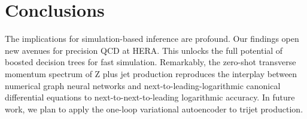\section{Conclusions}\label{sec:conclusions}

The implications for simulation-based inference are profound. Our
findings open new avenues for precision QCD at HERA. This unlocks the
full potential of boosted decision trees for fast simulation.
Remarkably, the zero-shot transverse momentum spectrum of Z plus jet
production reproduces the interplay between numerical graph neural
networks and next-to-leading-logarithmic canonical differential
equations to next-to-next-to-leading logarithmic accuracy. In future
work, we plan to apply the one-loop variational autoencoder to trijet
production.

